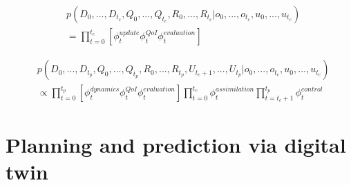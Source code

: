 \begin{equation}
\begin{aligned}
& p(D_{0},...,D_{t_{c}},Q_{0},...,Q_{t_{c}},R_{0},...,R_{t_{c}}|o_{0},...,o_{t_{c}},u_{0},...,u_{t_{c}}) \\
& = \prod_{t=0}^{t_{c}}[\phi_{t}^{update}\phi_{t}^{QoI}\phi_{t}^{evaluation}] \label{equation 2.1}
\end{aligned}
\end{equation}


\begin{equation}
\begin{aligned}
    & p(D_{0},...,D_{t_{p}},Q_{0},...,Q_{t_{p}},R_{0},...,R_{t_{p}},U_{t_{c}+1},...,U_{t_{p}}|o_{0},...,o_{t_{c}},u_{0},...,u_{t_{c}}) \\
    & \propto \prod_{t=0}^{t_{p}}[\phi_{t}^{dynamics}\phi_{t}^{QoI}\phi_{t}^{evaluation}] \prod_{t=0}^{t_{c}}\phi_{t}^{assimilation} \prod_{t=t_{c}+1}^{t_{p}}\phi_{t}^{control} \label{equation 2.2}
\end{aligned}
\end{equation}




\section{Planning and prediction via digital twin}